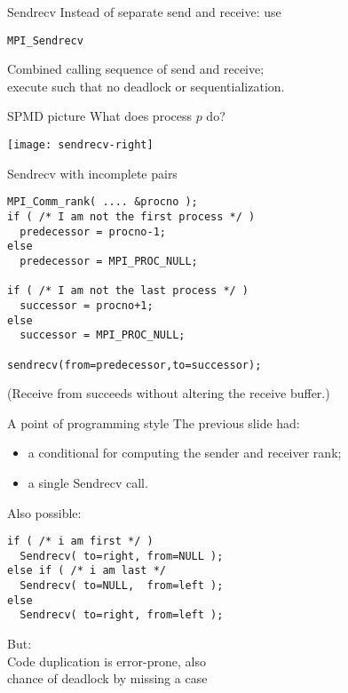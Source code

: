 \begin{numberedframe}{Sendrecv}
  Instead of separate send and receive: use

  \lstinline{MPI_Sendrecv}

  Combined calling sequence of send and receive;\\
  execute such that no deadlock or sequentialization.
\end{numberedframe}


\begin{numberedframe}{SPMD picture}
  What does process $p$ do?
  
  \texttt{[image: sendrecv-right]}
\end{numberedframe}

\begin{numberedframe}{Sendrecv with incomplete pairs}
\lstset{language=C}
\begin{lstlisting}
MPI_Comm_rank( .... &procno );
if ( /* I am not the first process */ )
  predecessor = procno-1;
else
  predecessor = MPI_PROC_NULL;

if ( /* I am not the last process */ )
  successor = procno+1;
else
  successor = MPI_PROC_NULL;

sendrecv(from=predecessor,to=successor);  
\end{lstlisting}
(Receive from  succeeds without altering
the receive buffer.)
\end{numberedframe}

\begin{numberedframe}{A point of programming style}
  The previous slide had:
  \begin{itemize}
  \item a conditional for computing the sender and receiver rank;
  \item a single Sendrecv call.
  \end{itemize}
  Also possible:
\lstset{language=C}
\begin{lstlisting}
if ( /* i am first */ )
  Sendrecv( to=right, from=NULL );
else if ( /* i am last */
  Sendrecv( to=NULL,  from=left );
else 
  Sendrecv( to=right, from=left );
\end{lstlisting}
But:\\
Code duplication is error-prone, also\\
chance of deadlock by missing a case
\end{numberedframe}

\begin{optexerciseframe}[rightsend]
  
\end{optexerciseframe}

